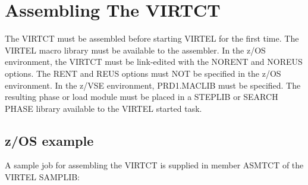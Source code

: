 \documentclass[letterpaper,10pt,english]{sphinxmanual}
\begin{document}
\begin{sphinxVerbatim}[commandchars=\\\{\}]
   
   
\end{sphinxVerbatim}



\section{Assembling The VIRTCT}
\label{\detokenize{Installation_Guide:index-145}}\label{\detokenize{Installation_Guide:id8}}
The VIRTCT must be assembled before starting VIRTEL for the first time. The VIRTEL macro library must be available to the assembler. In the z/OS environment, the VIRTCT must be link-edited with the NORENT and NOREUS options. The RENT and REUS options must NOT be specified in the z/OS environment. In the z/VSE environment, PRD1.MACLIB must be specified. The resulting phase or load module must be placed in a STEPLIB or SEARCH PHASE library available to the VIRTEL started task.


\subsection{z/OS example}
\label{\detokenize{Installation_Guide:z-os-example}}\label{\detokenize{Installation_Guide:index-146}}
A sample job for assembling the VIRTCT is supplied in member ASMTCT of the VIRTEL SAMPLIB:
\end{document}
